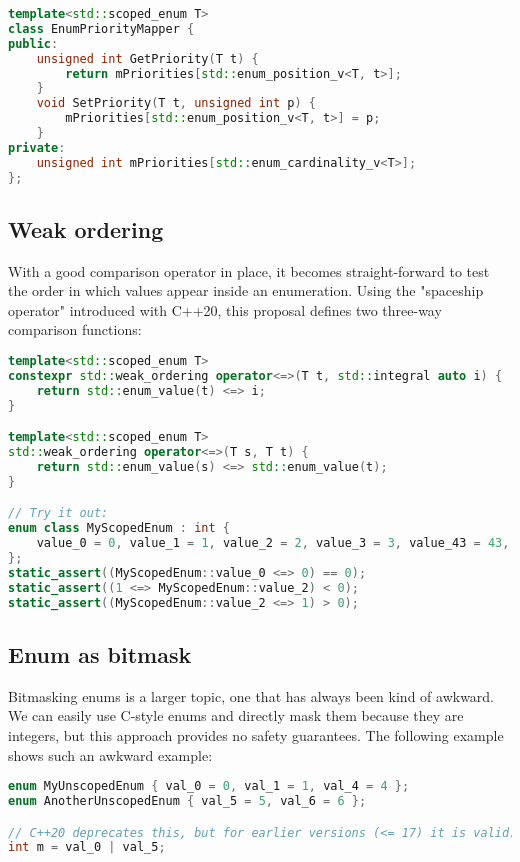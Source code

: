 \documentclass[
  format=manuscript,
  screen=true,
  review=false,
  nonacm=true,
  timestamp=true,
  balance=false]{acmart}
\newcommand{\beforecodespace}{\vspace{4mm}}
\begin{document}
\begin{lstlisting}[language=Cpp]
template<std::scoped_enum T>
class EnumPriorityMapper {
public:
    unsigned int GetPriority(T t) {
        return mPriorities[std::enum_position_v<T, t>];
    }
    void SetPriority(T t, unsigned int p) {
        mPriorities[std::enum_position_v<T, t>] = p;
    }
private:
    unsigned int mPriorities[std::enum_cardinality_v<T>];
};
\end{lstlisting}


\subsection{Weak ordering}

With a good comparison operator in place, it becomes straight-forward to test
the order in which values appear inside an enumeration. Using the "spaceship operator"
introduced with C++20, this proposal defines two three-way comparison functions:\vspace{2mm}

\begin{lstlisting}[language=Cpp]
template<std::scoped_enum T>
constexpr std::weak_ordering operator<=>(T t, std::integral auto i) {
    return std::enum_value(t) <=> i;
}

template<std::scoped_enum T>
std::weak_ordering operator<=>(T s, T t) {
    return std::enum_value(s) <=> std::enum_value(t);
}

// Try it out:
enum class MyScopedEnum : int {
    value_0 = 0, value_1 = 1, value_2 = 2, value_3 = 3, value_43 = 43, value_57 = 57
};
static_assert((MyScopedEnum::value_0 <=> 0) == 0);
static_assert((1 <=> MyScopedEnum::value_2) < 0);
static_assert((MyScopedEnum::value_2 <=> 1) > 0);
\end{lstlisting}


\subsection{Enum as bitmask}

Bitmasking enums is a larger topic, one that has always been kind of awkward.
We can easily use C-style enums and directly mask them because they are integers,
but this approach provides no safety guarantees. The following example shows such
an awkward example:

\beforecodespace\begin{lstlisting}[language=Cpp]
enum MyUnscopedEnum { val_0 = 0, val_1 = 1, val_4 = 4 };
enum AnotherUnscopedEnum { val_5 = 5, val_6 = 6 };

// C++20 deprecates this, but for earlier versions (<= 17) it is valid.
int m = val_0 | val_5;
\end{lstlisting}
\end{document}
